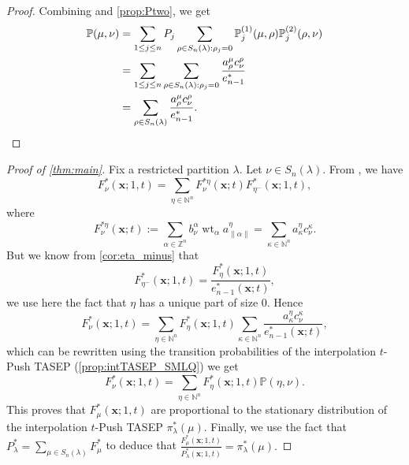 \documentclass[12pt]{amsart}
\theoremstyle{definition}
\newcommand{\bfx}{\boldsymbol{x}}
\DeclareMathOperator{\wt}{wt}
\newcommand{\ZZ}{\mathbb Z}
\newcommand{\NN}{\mathbb N}
\newcommand{\PP}{\mathbb P}
\newcommand{\PPone}[1]{\mathbb P^{(1)}_{#1}}
\newcommand{\PPtwo}[1]{\mathbb P^{(2)}_{#1}}
\def\LW#1{(\textcolor{teal}{LW:#1})}
\def\HBD#1{(\textcolor{violet}{HBD:#1})}
\begin{document}
\begin{proof}
    Combining 
    \cite[Lemma 5.4]{AyyerMartinWilliams2025}
     and \cref{prop:Ptwo}, we get
    \begin{align*}
    \PP(\mu,\nu)
    &=\sum_{1\leq j\leq n}P_j\sum_{\rho\in S_n(\lambda):\rho_j=0}\PPone{j}(\mu,\rho)\PPtwo{j}(\rho,\nu)\\
    &=\sum_{1\leq j\leq n}\sum_{\rho\in S_n(\lambda):\rho_j=0}  \frac{a^\mu_\rho c^\rho_{\nu}}{e^*_{n-1}}\\
    &=\sum_{\rho\in S_n(\lambda)}  \frac{a^\mu_\rho c^\rho_{\nu}}{e^*_{n-1}}.\qedhere
\end{align*}
\end{proof}

\begin{proof}[Proof of \cref{thm:main}]
Fix a restricted partition $\lambda$.
Let $\nu\in S_n(\lambda)$.
From 
\cite[Theorem 1.15 and Lemma 5.6]{BenDaliWilliams2025}, 
we have
 \begin{equation*}
   F^*_\nu(\bfx;1,t)=\sum_{\eta\in\NN^n}{F^{*\eta}_\nu}(\bfx;t) F^*_{\eta^{-}}(\bfx;1,t), 
 \end{equation*}
 where 
 $$F^{*\eta}_{\nu}(\bfx;t) :=\sum_{\alpha\in\ZZ^n}b_\nu^\alpha \wt_\alpha a^\eta_{\lVert \alpha\rVert}=\sum_{\kappa\in \NN^n}a_\kappa^\eta c^\kappa_\nu .$$
But we know from 
\cref{cor:eta_minus} that
$$F^*_{\eta^-}(\bfx;1,t)=\frac{F^*_{\eta}(\bfx;1,t)}{e_{n-1}^*(\bfx;t)},$$
we use here the fact that $\eta$ has a unique part of size 0.
Hence
\begin{equation*}
   F^*_\nu(\bfx;1,t)=\sum_{\eta\in\NN^n}F^*_{\eta}(\bfx;1,t)\sum_{\kappa\in \NN^n}\frac{a_\kappa^\eta c^\kappa_\nu}{e_{n-1}^*(\bfx;t)},
 \end{equation*}
which can be rewritten using the transition probabilities of the interpolation $t$-Push TASEP (\cref{prop:intTASEP_SMLQ}) we get
\begin{equation*}
   F^*_\nu(\bfx;1,t)=\sum_{\eta\in\NN^n}F^*_{\eta}(\bfx;1,t)\PP(\eta,\nu).
 \end{equation*}
This proves that $F^*_\mu(\bfx;1,t)$ are proportional to the stationary distribution of the interpolation $t$-Push TASEP $\pi^*_\lambda(\mu)$.
Finally, we use 
the fact that 
$P^*_\lambda=\sum_{\mu\in S_n(\lambda)}F^*_\mu$ to deduce that $\frac{F^*_\mu(\bfx;1,t)}{P^*_\lambda(\bfx;1,t)}=\pi^*_\lambda(\mu).$
\end{proof}
\end{document}
